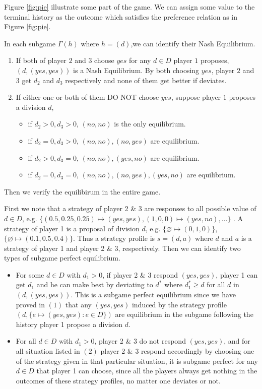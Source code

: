 \documentclass[a4paper,12pt]{article}
\begin{document}
\begin{enumerate}
Figure \ref{fig:pie} illustrate some part of the game. 
We can assign some value to the terminal history as the outcome which satisfies the preference relation as in Figure \ref{fig:pie}.

In each subgame $\Gamma(h)$ where $h=(d)$,we can identify their Nash Equilibrium.
\begin{enumerate}[(1)]
\item
If both of player $2$ and $3$ choose $yes$ for any $d \in D$ player $1$ proposes, 
$(d,(yes,yes))$ is a Nash Equilibrium.
By both choosing $yes$, player $2$ and $3$ get $d_2$ and $d_3$ respectively and none of them get better if deviates.
\item 
If either one or both of them DO NOT choose $yes$, suppose player $1$ proposes a division $d$,
\begin{itemize}
	\item if $d_2>0,d_3>0$, $(no,no)$ is the only equilibrium.
	\item if $d_2=0,d_3>0$, $(no,no),(no,yes)$ are equilibrium.
	\item if $d_2>0,d_3=0$, $(no,no),(yes,no)$ are equilibrium.
	\item if $d_2=0,d_3=0$, $(no,no),(no,yes),(yes,no)$ are equilibrium.
\end{itemize}
\end{enumerate}

Then we verify the equilibirum in the entire game.

First we note that a strategy of player 2 \& 3 are responses to all possible value of $d\in D$,
e.g. $\{(0.5,0.25,0.25)\mapsto(yes,yes),(1,0,0)\mapsto(yes,no),...\}$ .
A strategy of player 1 is a proposal of division $d$, e.g. $\{ \varnothing \mapsto (0,1,0) \}$,$\{ \varnothing \mapsto (0.1,0.5,0.4) \}$.
Thus a strategy profile is $s=(d,a)$ where $d$ and $a$ is a strategy of player 1 and player 2 \& 3, respectively.
Then we can identify two types of subgame perfect equilibrium.
\begin{itemize}
  \item
For some $d \in D$ with $d_1>0$, if player 2 \& 3 respond $(yes,yes)$,
player 1 can get $d_1$ and he can make best by deviating to $d^*$ where $d_1^* \ge d$ for all $d$ in $(d,(yes,yes))$.
This is a subgame perfect equilibrium since we have proved in $(1)$ that
any $(yes,yes)$ induced by the strategy profile $(d,\{e\mapsto(yes,yes):e\in D\})$ are equilibrium in
the subgame following the history player 1 propose a division $d$.

  \item
For all $d\in D$ with $d_1>0$, player 2 \& 3 do not respond $(yes,yes)$,
and for all situation listed in $(2)$ player 2 \& 3 respond accordingly
by choosing one of the strategy given in that particular situation,
it is subgame perfect for any $d\in D$ that player 1 can choose,
since all the players always get nothing in the outcomes of these strategy profiles,
no matter one deviates or not.
\end{itemize}


\end{enumerate}
\end{document}
